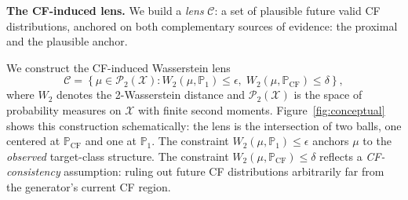 \textbf{The CF-induced lens.}
We build a \emph{lens} $\mathcal{C}$: a set of plausible future valid CF distributions, anchored on both complementary sources of evidence: the proximal and the plausible anchor.

We construct the CF-induced Wasserstein lens
\begin{equation}\label{eq:cf-inducedlens}
  \mathcal C
=
\left\{
\mu\in \mathcal{P}_2(\mathcal X):
W_2(\mu,\mathbb{P}_1)\le\epsilon,\;
W_2(\mu,\mathbb{P}_{\mathrm{CF}})\le\delta
\right\},  
\end{equation}
where $W_2$ denotes the 2-Wasserstein distance and $\mathcal{P}_2(\mathcal X)$ is the space of probability measures on $\mathcal{X}$ with finite second moments. 
Figure~\ref{fig:conceptual} shows this construction schematically: the lens is the intersection of two balls, one centered at $\mathbb{P}_{\mathrm{CF}}$ and one at $\mathbb{P}_1$.
The constraint $W_2(\mu,\mathbb{P}_1)\le\epsilon$ anchors $\mu$ to the \emph{observed} target-class structure. %
The constraint $W_2(\mu,\mathbb{P}_{\mathrm{CF}})\le \delta$ reflects a \emph{CF-consistency} assumption: 
ruling out future CF distributions arbitrarily far from the generator's current CF region. %

